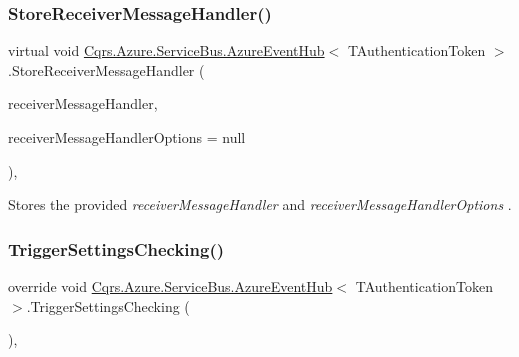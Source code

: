 \subsubsection{\texorpdfstring{Store\+Receiver\+Message\+Handler()}{StoreReceiverMessageHandler()}}
{\footnotesize\ttfamily virtual void \hyperlink{classCqrs_1_1Azure_1_1ServiceBus_1_1AzureEventHub}{Cqrs.\+Azure.\+Service\+Bus.\+Azure\+Event\+Hub}$<$ T\+Authentication\+Token $>$.Store\+Receiver\+Message\+Handler (\begin{DoxyParamCaption}\item[{Action$<$ Partition\+Context, Event\+Data $>$}]{receiver\+Message\+Handler,  }\item[{Event\+Processor\+Options}]{receiver\+Message\+Handler\+Options = {\ttfamily null} }\end{DoxyParamCaption})\hspace{0.3cm}{\ttfamily [protected]}, {\ttfamily [virtual]}}



Stores the provided {\itshape receiver\+Message\+Handler}  and {\itshape receiver\+Message\+Handler\+Options} . 

\mbox{\label{classCqrs_1_1Azure_1_1ServiceBus_1_1AzureEventHub_a779ce1115cf00dfaf072056a6ad8f9fe_a779ce1115cf00dfaf072056a6ad8f9fe}} 
\subsubsection{\texorpdfstring{Trigger\+Settings\+Checking()}{TriggerSettingsChecking()}}
{\footnotesize\ttfamily override void \hyperlink{classCqrs_1_1Azure_1_1ServiceBus_1_1AzureEventHub}{Cqrs.\+Azure.\+Service\+Bus.\+Azure\+Event\+Hub}$<$ T\+Authentication\+Token $>$.Trigger\+Settings\+Checking (\begin{DoxyParamCaption}{ }\end{DoxyParamCaption})\hspace{0.3cm}{\ttfamily [protected]}, {\ttfamily [virtual]}}



